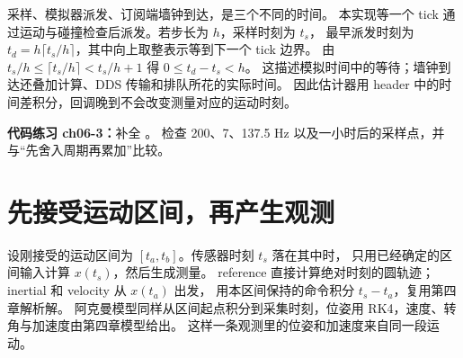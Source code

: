 \par\noindent\begin{minipage}{\linewidth}

\end{minipage}\par

\begin{center}
\end{center}

采样、模拟器派发、订阅端墙钟到达，是三个不同的时间。
本实现等一个 tick 通过运动与碰撞检查后派发。若步长为 $h$，采样时刻为 $t_s$，
最早派发时刻为 $t_d=h\lceil t_s/h\rceil$，其中向上取整表示等到下一个 tick 边界。
由 $t_s/h\le\lceil t_s/h\rceil<t_s/h+1$ 得 $0\le t_d-t_s<h$。
这描述模拟时间中的等待；墙钟到达还叠加计算、DDS 传输和排队所花的实际时间。
因此估计器用 header 中的时间差积分，回调晚到不会改变测量对应的运动时刻。

\textbf{代码练习 ch06-3：}补全 。
检查 200、7、137.5 Hz 以及一小时后的采样点，并与“先舍入周期再累加”比较。

\section{先接受运动区间，再产生观测}
设刚接受的运动区间为 $[t_a,t_b]$。传感器时刻 $t_s$ 落在其中时，
只用已经确定的区间输入计算 $x(t_s)$，然后生成测量。
reference 直接计算绝对时刻的圆轨迹；inertial 和 velocity 从 $x(t_a)$ 出发，
用本区间保持的命令积分 $t_s-t_a$，复用第四章解析解。
阿克曼模型同样从区间起点积分到采集时刻，位姿用 RK4，速度、转角与加速度由第四章模型给出。
这样一条观测里的位姿和加速度来自同一段运动。

\par\noindent\begin{minipage}{\linewidth}

\end{minipage}\par

